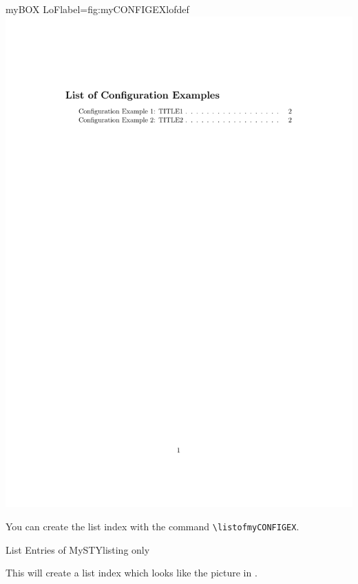\documentclass[]{myHOWTO-V001}
\begin{document}
\begin{minipage}{0.46\linewidth}
\centering
\begin{myFIGlst}{myBOX LoF}{label={fig:myCONFIGEXlofdef}}
	\includegraphics[page=1,scale=0.18]{examples/myCONFIGEXV000.pdf}
\end{myFIGlst}
\end{minipage}
\begin{minipage}{0.46\linewidth}
You can create the list index with the command \Verb|\listofmyCONFIGEX|.

\begin{myTEXEXdoclst}{List Entries of MySTY}{listing only}
\listofmyCONFIGEX
\end{myTEXEXdoclst}

This will create a list index which looks like the picture in . 
\end{minipage}
\end{document}
